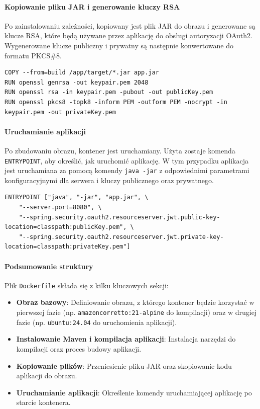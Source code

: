 \paragraph{Kopiowanie pliku JAR i generowanie kluczy RSA}
Po zainstalowaniu zależności, kopiowany jest plik JAR do obrazu i generowane są klucze RSA, które będą używane przez aplikację do obsługi autoryzacji OAuth2. Wygenerowane klucze publiczny i prywatny są następnie konwertowane do formatu PKCS\#8.
\begin{lstlisting}
COPY --from=build /app/target/*.jar app.jar
RUN openssl genrsa -out keypair.pem 2048
RUN openssl rsa -in keypair.pem -pubout -out publicKey.pem
RUN openssl pkcs8 -topk8 -inform PEM -outform PEM -nocrypt -in keypair.pem -out privateKey.pem
\end{lstlisting}

\paragraph{Uruchamianie aplikacji}
Po zbudowaniu obrazu, kontener jest uruchamiany. Użyta zostaje komenda \texttt{ENTRYPOINT}, aby określić, jak uruchomić aplikację. W tym przypadku aplikacja jest uruchamiana za pomocą komendy \texttt{java -jar} z odpowiednimi parametrami konfiguracyjnymi dla serwera i kluczy publicznego oraz prywatnego.
\begin{lstlisting}
ENTRYPOINT ["java", "-jar", "app.jar", \
    "--server.port=8080", \
    "--spring.security.oauth2.resourceserver.jwt.public-key-location=classpath:publicKey.pem", \
    "--spring.security.oauth2.resourceserver.jwt.private-key-location=classpath:privateKey.pem"]
\end{lstlisting}

\paragraph{Podsumowanie struktury}
Plik \texttt{Dockerfile} składa się z kilku kluczowych sekcji:
\begin{itemize}
    \item \textbf{Obraz bazowy}: Definiowanie obrazu, z którego kontener będzie korzystać w pierwszej fazie (np. \texttt{amazoncorretto:21-alpine} do kompilacji) oraz w drugiej fazie (np. \texttt{ubuntu:24.04} do uruchomienia aplikacji).
    \item \textbf{Instalowanie Maven i kompilacja aplikacji}: Instalacja narzędzi do kompilacji oraz proces budowy aplikacji.
    \item \textbf{Kopiowanie plików}: Przeniesienie pliku JAR oraz skopiowanie kodu aplikacji do obrazu.
    \item \textbf{Uruchamianie aplikacji}: Określenie komendy uruchamiającej aplikację po starcie kontenera.
\end{itemize}

